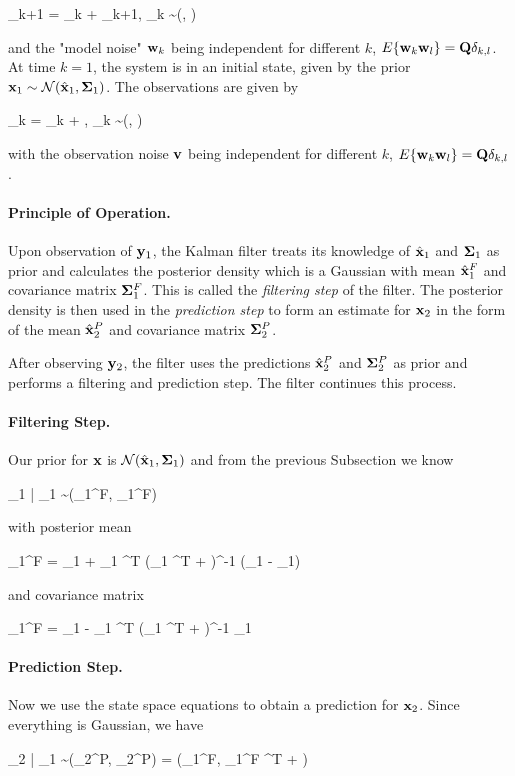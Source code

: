 \bee
\xbf_{k+1} = \Abf \xbf_k + \wbf_{k+1}, \quad \wbf_k \sim \Nc(\zerobf, \Qbf)
\eee

and the "model noise" $\mathbf{w}_k$ being independent for different $k$, $E\{\mathbf{w}_k \mathbf{w}_l\} = \mathbf{Q} \delta_{k,l}$. At time $k=1$, the system is in an initial state, given by the prior $\mathbf{x}_1 \sim \mathcal{N}(\hat {\mathbf{x}}_1, \mathbf{\Sigma}_1)$. The observations are given by

\bee
\ybf_k = \Gbf \xbf_k + \vbf, \quad \vbf_k \sim \Nc(\zerobf, \Rbf)
\eee

with the observation noise $\mathbf{v}$ being independent for different $k$, $E\{\mathbf{w}_k \mathbf{w}_l\} = \mathbf{Q} \delta_{k,l}$.

\paragraph{Principle of Operation.} Upon observation of $\mathbf{y}_1$, the Kalman filter treats its knowledge of $\hat {\mathbf{x}}_1$ and $\mathbf{\Sigma}_1$ as prior and calculates the posterior density which is a Gaussian with mean $\hat{\mathbf{x}}_1^F$ and covariance matrix $\mathbf{\Sigma}_1^F$. This is called the \emph{filtering step} of the filter. The posterior density is then used in the \emph{prediction step} to form an estimate for $\mathbf{x}_2$ in the form of the mean $\hat{\mathbf{x}}_2^P$ and covariance matrix $\mathbf{\Sigma}_2^P$.

After observing $\mathbf{y}_2$, the filter uses the predictions $\hat{\mathbf{x}}_2^P$ and $\mathbf{\Sigma}_2^P$ as prior and performs a filtering and prediction step. The filter continues this process.

\paragraph{Filtering Step.} Our prior for $\mathbf{x}$ is $\mathcal{N}(\hat{\mathbf{x}}_1, \mathbf{\Sigma}_1)$ and from the previous Subsection we know

\bee
\xbf_1 | \ybf_1 \sim \Nc(\xbf_1^F, \Sigmabf_1^F)
\eee

with posterior mean

\bee
\xbf_1^F = \hat\xbf_1 + \Sigmabf_1 \Gbf^T (\Gbf \Sigmabf_1 \Gbf^T + \Rbf)^{-1} (\ybf_1 - \Gbf \hat\xbf_1)
\eee

and covariance matrix

\bee
\Sigmabf_1^F = \Sigmabf_1 - \Sigmabf_1 \Gbf^T (\Gbf \Sigmabf_1 \Gbf^T + \Rbf)^{-1} \Gbf \Sigmabf_1
\eee

\paragraph{Prediction Step.} Now we use the state space equations to obtain a prediction for $\mathbf{x}_2$. Since everything is Gaussian, we have

\bee
\xbf_2 | \ybf_1 \sim \Nc(\hat\xbf_2^P, \Sigmabf_2^P) = \Nc(\Abf \xbf_1^F, \Abf \Sigmabf_1^F \Abf^T + \Rbf)
\eee


